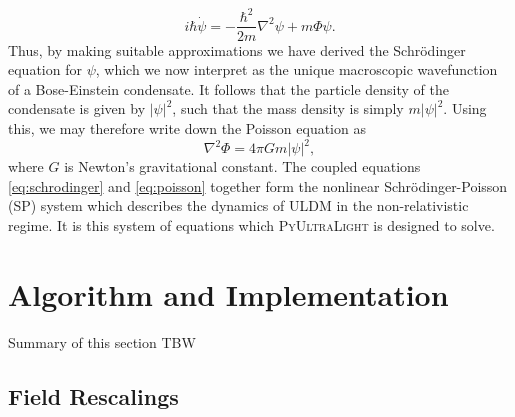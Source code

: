 \documentclass[a4paper,11pt]{article}
\newcommand{\PyUltraLight}{\textsc{PyUltraLight }}
\begin{document}
\begin{equation}\label{eq:schrodinger}
    i\hbar\Dot{\psi}=-\frac{\hbar^2}{2m}\nabla^2\psi+m\Phi\psi.
\end{equation}
Thus, by making suitable approximations we have derived the Schr{\"o}dinger equation for $\psi$, which we now interpret as the unique macroscopic wavefunction of a Bose-Einstein condensate. It follows that the particle density of the condensate is given by $\vert\psi\vert^2$, such that the mass density is simply $m\vert\psi\vert^2$. Using this, we may therefore write down the Poisson equation as
\begin{equation}\label{eq:poisson}
    \nabla^2\Phi=4\pi G m \vert\psi\vert^2,
\end{equation}
where $G$ is Newton's gravitational constant. The coupled equations \ref{eq:schrodinger} and \ref{eq:poisson} together form the nonlinear Schr{\"o}dinger-Poisson (SP) system which describes the dynamics of ULDM in the non-relativistic regime. It is this system of equations which \PyUltraLight is designed to solve.

\section{Algorithm and Implementation}\label{sec:implementation}

Summary of this section TBW

\subsection{Field Rescalings}
\end{document}
